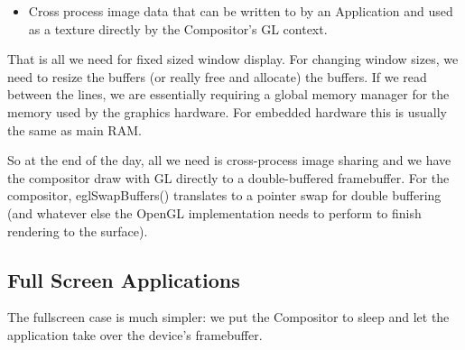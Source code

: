 \documentclass[a4paper,11pt]{article}
\begin{document}
\begin{indenter}{2cm}
\begin{itemize}
\item Cross process image data that can be written to by an Application and
used as a texture directly by the Compositor's GL context.
\end{itemize}

That is all we need for fixed sized window display. For changing window
sizes, we need to resize the buffers (or really free and allocate) the buffers.
If we read between the lines, we are essentially requiring a global memory manager
for the memory used by the graphics hardware. For embedded hardware this is usually
the same as main RAM.

So at the end of the day, all we need is cross-process image sharing
and we have the compositor draw with GL directly to a double-buffered
framebuffer. For the compositor, eglSwapBuffers() translates to a pointer
swap for double buffering (and whatever else the OpenGL implementation
needs to perform to finish rendering to the surface).

\end{indenter}
\subsection{Full Screen Applications}
\begin{indenter}{2cm}

The fullscreen case is much simpler: we put the Compositor to sleep and
let the application take over the device's framebuffer.

\end{indenter}
\end{document}

